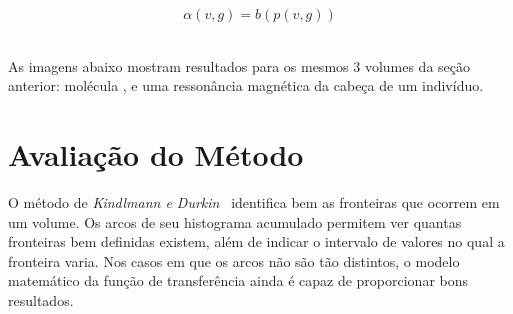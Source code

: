 \begin{equation} \label{eq:alphavg}
	\alpha(v, g) = b(p(v, g))
\end{equation} \

	As imagens abaixo mostram resultados para os mesmos 3 volumes da seção anterior: molécula ,  e uma ressonância magnética da cabeça de um indivíduo.
	

%
%

\section{Avaliação do Método}
\label{sec:gordon.aval}
	O método de \textit{Kindlmann e Durkin}~\cite{gordon} identifica bem as fronteiras que ocorrem em um volume. Os arcos de seu histograma acumulado permitem ver quantas fronteiras bem definidas existem, além de indicar o intervalo de valores no qual a fronteira varia. Nos casos em que os arcos não são tão distintos, o modelo matemático da função de transferência ainda é capaz de proporcionar bons resultados.
	
